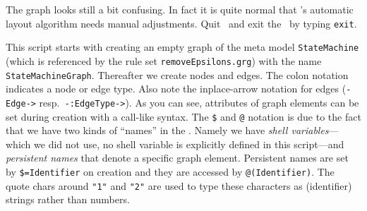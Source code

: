 The graph looks still a bit confusing.
In fact it is quite normal that \yComp's automatic layout algorithm needs manual adjustments.
Quit \yComp\ and exit the \GrShell\ by typing \texttt{exit}.

This script starts with creating an empty graph of the meta model \texttt{StateMachine} (which is referenced by the rule set \texttt{removeEpsilons.grg}) with the name \texttt{StateMachineGraph}.
Thereafter we create nodes and edges.
The colon notation indicates a node or edge type.
Also note the inplace-arrow notation for edges (\texttt{-Edge->} resp.\ \texttt{-:EdgeType->}).
As you can see, attributes of graph elements can be set during creation with a call-like syntax.
\makeatletter
The \texttt{\$} and \texttt{@} notation is due to the fact that we have two kinds of ``names'' in the \GrShell.
Namely we have \emph{shell variables}---which we did not use, no shell variable is explicitly defined in this script---and \emph{persistent names} that denote a specific graph element.
Persistent names are set by \texttt{\$=Identifier} on creation and they are accessed by \texttt{@(Identifier)}.
\makeatother
The quote chars around \texttt{"1"} and \texttt{"2"} are used to type these characters as (identifier) strings rather than numbers.

